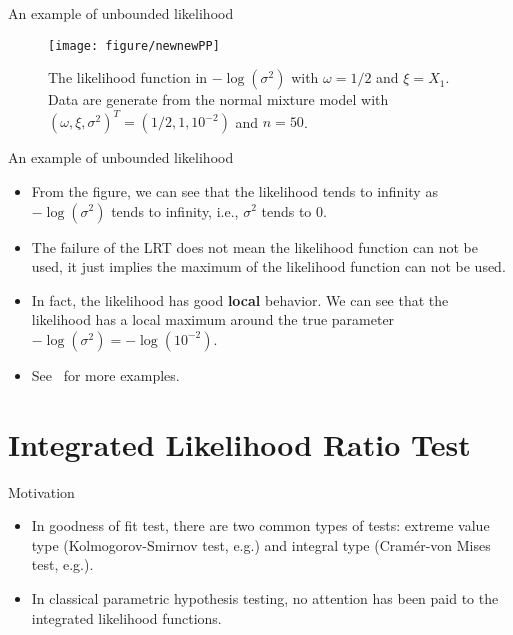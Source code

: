 \documentclass{beamer}
\theoremstyle{plain}
\theoremstyle{definition}
\theoremstyle{remark}
\begin{document}
\begin{frame}{An example of unbounded likelihood}
    
\begin{figure}
    \begin{center}
        \texttt{[image: figure/newnewPP]}
    \end{center}
    \caption{
        The likelihood function in $-\log (\sigma^2)$ with $\omega=1/2$ and $\xi=X_1$.
    Data are generate from the normal mixture model with $(\omega,\xi,\sigma^2)^T=(1/2,1,10^{-2})$ and $n=50$.
    }
    \label{myFigure1}
\end{figure}
\end{frame}


\begin{frame}{An example of unbounded likelihood}

    \begin{itemize}
        \item
    From the figure, we can see that the likelihood tends to infinity as $-\log (\sigma^2)$ tends to infinity, i.e., $\sigma^2$ tends to $0$.
        \item 
        The failure of the LRT does not mean the likelihood function can not be used, it just implies the maximum of the likelihood function can not be used.
        \item
    In fact, the likelihood has good \textbf{local} behavior.
        We can see that the likelihood has a local maximum around the true parameter $-\log (\sigma^{2})=-\log (10^{-2})$.
    \item
        See~\cite{Cam1990Maximum} for more examples.
    \end{itemize}


\end{frame}
\section{Integrated Likelihood Ratio Test}
\begin{frame}{Motivation}
    \begin{itemize}
        \item 
In goodness of fit test, there are two common types of tests: extreme value type (Kolmogorov-Smirnov test, e.g.) and integral type (Cram\'er-von Mises test, e.g.).
\item
In classical parametric hypothesis testing, no attention has been paid to the integrated likelihood functions.
    \end{itemize}

\end{frame}    
\end{document}
